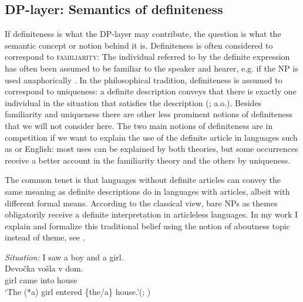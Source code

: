 \documentclass[output=paper]{langscibook}
\begin{document}
\subsection{DP-layer: Semantics of definiteness}

If definiteness is what the DP-layer may contribute, the question is what the semantic concept or notion behind it is. Definiteness is often considered to correspond to \textsc{familiarity}:  The individual referred to by the definite expression has often been assumed to be familiar to the speaker and hearer, e.g. if the NP is used anaphorically \citep{Christophersen1939,Heim1982}. In the philosophical tradition, definiteness is assumed to correspond to uniqueness: a definite description conveys that there is exactly one individual in the situation that satisfies the description (\citealt{Chierchia1998,Dayal2004}; a.o.). Besides familiarity and uniqueness there are other less prominent notions of definiteness that we will not consider here. The two main notions of definiteness are in competition if we want to explain the use of the definite article in languages such as  or English: most uses can be explained by both theories, but some occurrences receive a better account in the familiarity theory and the others by uniqueness.

The common tenet is that languages without definite articles can convey the same meaning as definite descriptions do in languages with articles, albeit with different formal means. According to the classical view, bare NPs as themes obligatorily receive a definite interpretation in articleless  languages. In my work \citet{Geist2010} I explain and formalize this traditional belief using the notion of aboutness topic instead of theme, see .


\ea \label{ex:9} \textit{Situation:} I saw a boy and a girl.\\
\gll Devočka	 vošla   	v     dom. \\
    girl  came  	into house\\
\glt `The (*a) girl entered \{the/a\} house.'\hfill (; \citealt[193]{Geist2010})
\z
\end{document}
